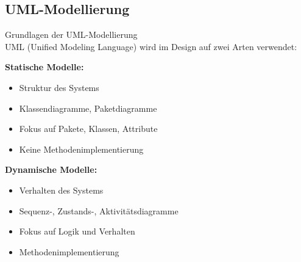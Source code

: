 \subsection{UML-Modellierung}


\begin{concept}{Grundlagen der UML-Modellierung}\\
UML (Unified Modeling Language) wird im Design auf zwei Arten verwendet:

\textbf{Statische Modelle:}
\begin{itemize}
    \item Struktur des Systems
    \item Klassendiagramme, Paketdiagramme
    \item Fokus auf Pakete, Klassen, Attribute
    \item Keine Methodenimplementierung
\end{itemize}

\textbf{Dynamische Modelle:}
\begin{itemize}
    \item Verhalten des Systems
    \item Sequenz-, Zustands-, Aktivitätsdiagramme
    \item Fokus auf Logik und Verhalten
    \item Methodenimplementierung
\end{itemize}
\end{concept}


